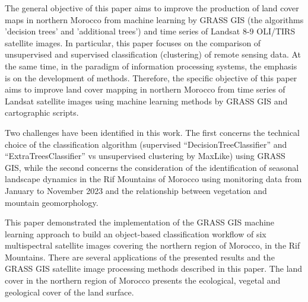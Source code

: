 \documentclass[geomatics,article,submit,pdftex,moreauthors]{Definitions/mdpi}
\begin{document}
The general objective of this paper aims to improve the production of land cover maps in northern Morocco from machine learning by GRASS GIS (the algorithms 'decision trees' and 'additional trees') and time series of Landsat 8-9 OLI/TIRS satellite images. In particular, this paper focuses on the comparison of unsupervised and supervised classification (clustering) of remote sensing data. At the same time, in the paradigm of information processing systems, the emphasis is on the development of methods. Therefore, the specific objective of this paper aims to improve land cover mapping in northern Morocco from time series of Landsat satellite images using machine learning methods by GRASS GIS and cartographic scripts.

Two challenges have been identified in this work. The first concerns the technical choice of the classification algorithm (supervised “DecisionTreeClassifier” and “ExtraTreesClassifier” vs unsupervised clustering by MaxLike) using GRASS GIS, while the second concerns the consideration of the identification of seasonal landscape dynamics in the Rif Mountains of Morocco using monitoring data from January to November 2023 and the relationship between vegetation and mountain geomorphology.

This paper demonstrated the implementation of the GRASS GIS machine learning approach to build an object-based classification workflow of six multispectral satellite images covering the northern region of Morocco, in the Rif Mountains. There are several applications of the presented results and the GRASS GIS satellite image processing methods described in this paper. The land cover in the northern region of Morocco presents the ecological, vegetal and geological cover of the land surface.




\end{document}
